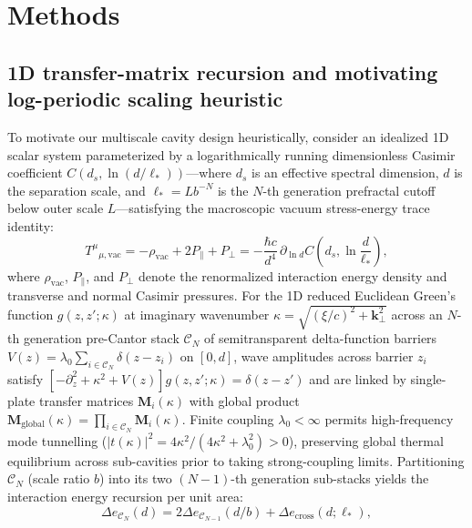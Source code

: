\documentclass[11pt, a4paper]{article}
\begin{document}
\section*{Methods}

\subsection*{1D transfer-matrix recursion and motivating log-periodic scaling heuristic}
To motivate our multiscale cavity design heuristically\cite{gordon2026prd}, consider an idealized 1D scalar system parameterized by a logarithmically running dimensionless Casimir coefficient $C(d_s, \ln(d/\ell_*))$---where $d_s$ is an effective spectral dimension, $d$ is the separation scale, and $\ell_* = L b^{-N}$ is the $N$-th generation prefractal cutoff below outer scale $L$---satisfying the macroscopic vacuum stress-energy trace identity\cite{gordon2026prd}:
\begin{equation}
T^\mu{}_{\mu,\mathrm{vac}} = -\rho_{\mathrm{vac}} + 2P_\parallel + P_\perp = -\frac{\hbar c}{d^4} \,\partial_{\ln d}C\!\left(d_s, \ln\frac{d}{\ell_*}\right),
\label{eq:trace_running}
\end{equation}
where $\rho_{\mathrm{vac}}$, $P_\parallel$, and $P_\perp$ denote the renormalized interaction energy density and transverse and normal Casimir pressures. For the 1D reduced Euclidean Green's function $g(z, z'; \kappa)$ at imaginary wavenumber $\kappa = \sqrt{(\xi/c)^2 + \mathbf{k}_\perp^2}$ across an $N$-th generation pre-Cantor stack $\mathcal{C}_N$ of semitransparent delta-function barriers $V(z) = \lambda_0 \sum_{i \in \mathcal{C}_N} \delta(z - z_i)$ on $[0, d]$, wave amplitudes across barrier $z_i$ satisfy $[-\partial_z^2 + \kappa^2 + V(z)]g(z,z';\kappa) = \delta(z-z')$ and are linked by single-plate transfer matrices $\mathbf{M}_i(\kappa)$ with global product $\mathbf{M}_{\mathrm{global}}(\kappa) = \prod_{i \in \mathcal{C}_N} \mathbf{M}_i(\kappa)$. Finite coupling $\lambda_0 < \infty$ permits high-frequency mode tunnelling ($|t(\kappa)|^2 = 4\kappa^2/(4\kappa^2 + \lambda_0^2) > 0$), preserving global thermal equilibrium across sub-cavities prior to taking strong-coupling limits\cite{gordon2026prd}. Partitioning $\mathcal{C}_N$ (scale ratio $b$) into its two $(N-1)$-th generation sub-stacks yields the interaction energy recursion per unit area:
\begin{equation}
\Delta e_{\mathcal{C}_N}(d) = 2 \Delta e_{\mathcal{C}_{N-1}}(d/b) + \Delta e_{\mathrm{cross}}(d; \ell_*),
\label{eq:recursion_main}
\end{equation}
\end{document}
